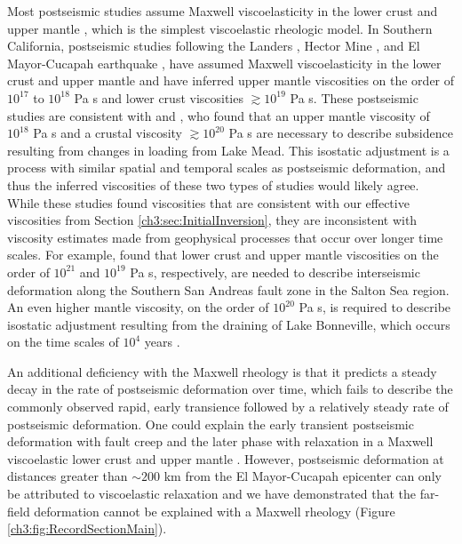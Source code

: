 Most postseismic studies assume Maxwell viscoelasticity in the lower
crust and upper mantle \citep[e.g.,][]{Nur1974, Pollitz2000,
Hetland2003, Freed2006a, Johnson2009, Hearn2009}, which is the
simplest viscoelastic rheologic model.  In Southern California,
postseismic studies following the Landers \citep{Pollitz2000}, Hector
Mine \citep{Pollitz2001}, and El Mayor-Cucapah earthquake
\citep{Spinler2015,Rollins2015}, have assumed Maxwell viscoelasticity
in the lower crust and upper mantle and have inferred upper mantle
viscosities on the order of $10^{17}$ to $10^{18}$ Pa s and lower
crust viscosities $\gtrsim 10^{19}$ Pa s. These postseismic studies
are consistent with \citet{Kaufmann2000} and \citet{Cavalie2007}, who
found that an upper mantle viscosity of $10^{18}$ Pa s and a crustal
viscosity $\gtrsim10^{20}$ Pa s are necessary to describe subsidence
resulting from changes in loading from Lake Mead. This isostatic
adjustment is a process with similar spatial and temporal scales as
postseismic deformation, and thus the inferred viscosities of these
two types of studies would likely agree. While these studies found
viscosities that are consistent with our effective viscosities from
Section \ref{ch3:sec:InitialInversion}, they are inconsistent with
viscosity estimates made from geophysical processes that occur over
longer time scales. For example, \citet{Lundgren2009} found that lower
crust and upper mantle viscosities on the order of $10^{21}$ and
$10^{19}$ Pa s, respectively, are needed to describe interseismic
deformation along the Southern San Andreas fault zone in the Salton
Sea region.  An even higher mantle viscosity, on the order of
$10^{20}$ Pa s, is required to describe isostatic adjustment resulting
from the draining of Lake Bonneville, which occurs on the time scales
of $10^{4}$ years \citep{Crittenden1967, Bills1987}.

An additional deficiency with the Maxwell rheology is that it predicts
a steady decay in the rate of postseismic deformation over time, which
fails to describe the commonly observed rapid, early transience
followed by a relatively steady rate of postseismic deformation.  One
could explain the early transient postseismic deformation with fault
creep and the later phase with relaxation in a Maxwell viscoelastic
lower crust and upper mantle \citep[e.g][]{Hearn2009,Johnson2009}.
However, postseismic deformation at distances greater than ${\sim}200$
km from the El Mayor-Cucapah epicenter can only be attributed to
viscoelastic relaxation \citep[e.g.,][]{Freed2007a} and we have
demonstrated that the far-field deformation cannot be explained with a
Maxwell rheology (Figure \ref{ch3:fig:RecordSectionMain}).

